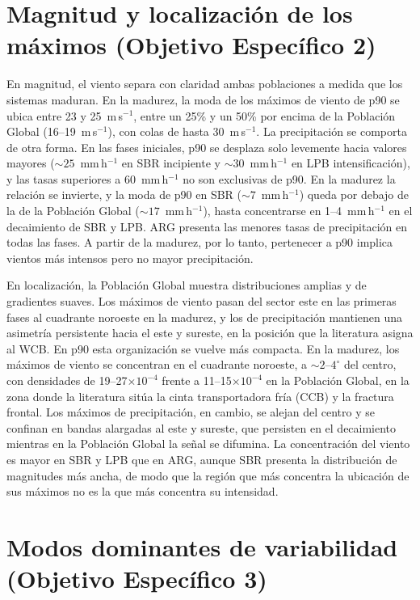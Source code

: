 \section{Magnitud y localización de los máximos (Objetivo Específico 2)}

En magnitud, el viento separa con claridad ambas poblaciones a medida que los sistemas maduran. En la madurez, la moda de los máximos de viento de p90 se ubica entre 23 y 25~m\,s$^{-1}$, entre un 25\% y un 50\% por encima de la Población Global (16--19~m\,s$^{-1}$), con colas de hasta 30~m\,s$^{-1}$. La precipitación se comporta de otra forma. En las fases iniciales, p90 se desplaza solo levemente hacia valores mayores (${\sim}25$~mm\,h$^{-1}$ en SBR incipiente y ${\sim}30$~mm\,h$^{-1}$ en LPB intensificación), y las tasas superiores a 60~mm\,h$^{-1}$ no son exclusivas de p90. En la madurez la relación se invierte, y la moda de p90 en SBR (${\sim}7$~mm\,h$^{-1}$) queda por debajo de la de la Población Global (${\sim}17$~mm\,h$^{-1}$), hasta concentrarse en 1--4~mm\,h$^{-1}$ en el decaimiento de SBR y LPB. ARG presenta las menores tasas de precipitación en todas las fases. A partir de la madurez, por lo tanto, pertenecer a p90 implica vientos más intensos pero no mayor precipitación.

En localización, la Población Global muestra distribuciones amplias y de gradientes suaves. Los máximos de viento pasan del sector este en las primeras fases al cuadrante noroeste en la madurez, y los de precipitación mantienen una asimetría persistente hacia el este y sureste, en la posición que la literatura asigna al WCB. En p90 esta organización se vuelve más compacta. En la madurez, los máximos de viento se concentran en el cuadrante noroeste, a ${\sim}2$--$4^{\circ}$ del centro, con densidades de 19--27$\times10^{-4}$ frente a 11--15$\times10^{-4}$ en la Población Global, en la zona donde la literatura sitúa la cinta transportadora fría (CCB) y la fractura frontal. Los máximos de precipitación, en cambio, se alejan del centro y se confinan en bandas alargadas al este y sureste, que persisten en el decaimiento mientras en la Población Global la señal se difumina. La concentración del viento es mayor en SBR y LPB que en ARG, aunque SBR presenta la distribución de magnitudes más ancha, de modo que la región que más concentra la ubicación de sus máximos no es la que más concentra su intensidad.

\section{Modos dominantes de variabilidad (Objetivo Específico 3)}

